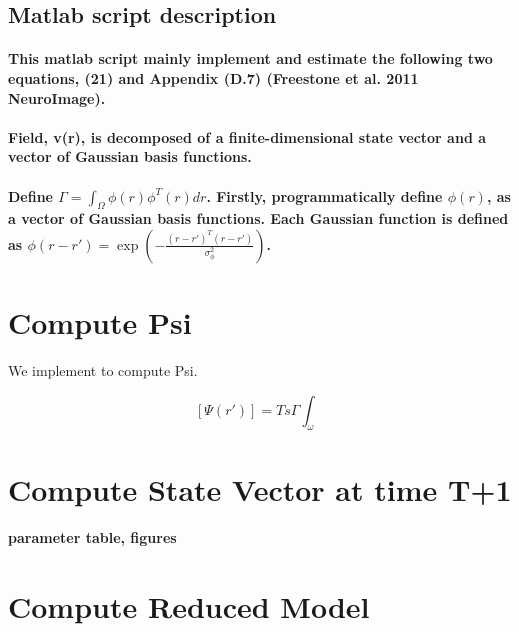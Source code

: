\documentclass[a4paper, 12pt, english]{article}
\begin{document}
\subsection*{Matlab script description}

\paragraph{This matlab script mainly implement and estimate the following two
equations, (21) and Appendix (D.7) (Freestone et al. 2011 NeuroImage).}

\paragraph{Field, v(r), is decomposed of a finite-dimensional state vector and
a vector of Gaussian basis functions.}

\paragraph{Define $\Gamma=\int_{\Omega}\phi(r)\phi^{T}(r)dr$. Firstly, programmatically
define $\phi(r)$, as a vector of Gaussian basis functions. Each Gaussian
function is defined as $\phi(r-r')=\exp{(-\frac{(r-r')^{T}(r-r')}{\sigma_{\phi}^{2}})}$.}

\newpage



\section{Compute Psi}
We implement to compute Psi.

\[[\Psi(r\prime)] = Ts\Gamma\int_\omega\]


\newpage


\section{Compute State Vector at time T+1}
\label{state vector}
\paragraph{parameter table, figures}

\newpage





\section{Compute Reduced Model}
\end{document}
